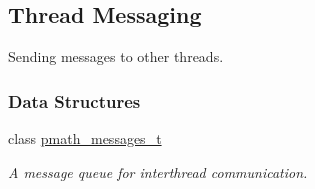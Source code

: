 \hypertarget{group__threadmsg}{
\subsection{Thread Messaging}
\label{group__threadmsg}
}
Sending messages to other threads.  


\subsubsection*{Data Structures}
\begin{CompactItemize}
\item 
class \hyperlink{classpmath__messages__t}{pmath\_\-messages\_\-t}
\begin{CompactList}\small\item\em A message queue for interthread communication. \item\end{CompactList}\end{CompactItemize}
